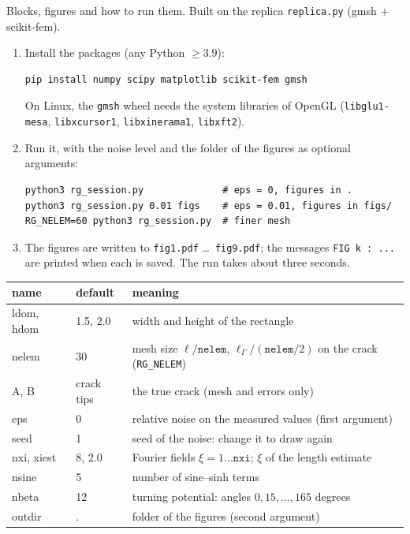   {Blocks, figures and how to run them. Built on the replica
   \texttt{replica.py} (gmsh + scikit-fem).}

\begin{enumerate}[itemsep=1pt]
\item Install the packages (any Python $\ge3.9$):
\begin{lstlisting}[style=shstyle]
pip install numpy scipy matplotlib scikit-fem gmsh
\end{lstlisting}
On Linux, the \texttt{gmsh} wheel needs the system libraries of OpenGL
(\texttt{libglu1-mesa}, \texttt{libxcursor1}, \texttt{libxinerama1},
\texttt{libxft2}).
\item Run it, with the noise level and the folder of the figures as optional
arguments:
\begin{lstlisting}[style=shstyle]
python3 rg_session.py              # eps = 0, figures in .
python3 rg_session.py 0.01 figs    # eps = 0.01, figures in figs/
RG_NELEM=60 python3 rg_session.py  # finer mesh
\end{lstlisting}
\item The figures are written to \texttt{fig1.pdf} \dots\ \texttt{fig9.pdf}; the
messages \texttt{FIG k : ...} are printed when each is saved. The run takes
about three seconds.
\end{enumerate}

\begin{center}\small
\begin{tabular}{>{\ttfamily}l l p{8cm}}
\toprule
\rmfamily name & default & meaning\\
\midrule
ldom, hdom & 1.5, 2.0 & width and height of the rectangle\\
nelem & 30 & mesh size $\ell/\texttt{nelem}$, $\ell_\Gamma/(\texttt{nelem}/2)$ on the crack (\texttt{RG\_NELEM})\\
A, B & crack tips & the true crack (mesh and errors only)\\
eps & 0 & relative noise on the measured values (first argument)\\
seed & 1 & seed of the noise: change it to draw again\\
nxi, xiest & 8, 2.0 & Fourier fields $\xi=1\dots\texttt{nxi}$; $\xi$ of the length estimate\\
nsine & 5 & number of sine--sinh terms\\
nbeta & 12 & turning potential: angles $0,15,\dots,165$ degrees\\
outdir & . & folder of the figures (second argument)\\
\bottomrule
\end{tabular}
\end{center}

